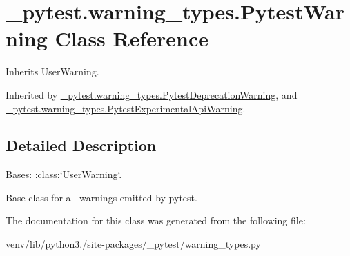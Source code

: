 \hypertarget{class__pytest_1_1warning__types_1_1_pytest_warning}{}\section{\+\_\+pytest.\+warning\+\_\+types.\+Pytest\+Warning Class Reference}
\label{class__pytest_1_1warning__types_1_1_pytest_warning}


Inherits User\+Warning.



Inherited by \hyperlink{class__pytest_1_1warning__types_1_1_pytest_deprecation_warning}{\+\_\+pytest.\+warning\+\_\+types.\+Pytest\+Deprecation\+Warning}, and \hyperlink{class__pytest_1_1warning__types_1_1_pytest_experimental_api_warning}{\+\_\+pytest.\+warning\+\_\+types.\+Pytest\+Experimental\+Api\+Warning}.



\subsection{Detailed Description}
\begin{DoxyVerb}Bases: :class:`UserWarning`.

Base class for all warnings emitted by pytest.
\end{DoxyVerb}
 

The documentation for this class was generated from the following file\+:\begin{DoxyCompactItemize}
\item 
venv/lib/python3./site-\/packages/\+\_\+pytest/warning\+\_\+types.\+py\end{DoxyCompactItemize}
